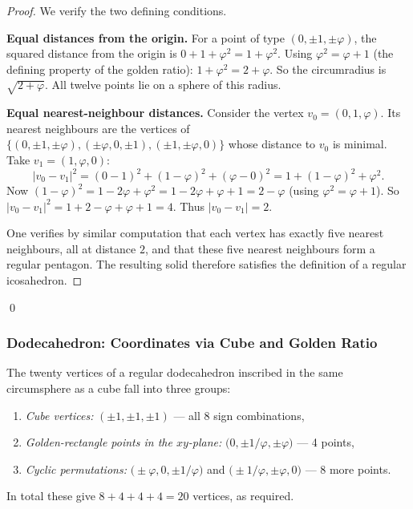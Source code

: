 \begin{proof}
We verify the two defining conditions.

\medskip
\noindent\textbf{Equal distances from the origin.}
For a point of type $(0,\pm 1,\pm\varphi)$, the squared distance from the origin is
$0 + 1 + \varphi^2 = 1 + \varphi^2$.
Using $\varphi^2 = \varphi + 1$ (the defining property of the golden ratio):
$1 + \varphi^2 = 2 + \varphi$.  So the circumradius is $\sqrt{2+\varphi}$.
All twelve points lie on a sphere of this radius.

\medskip
\noindent\textbf{Equal nearest-neighbour distances.}
Consider the vertex $v_0 = (0,1,\varphi)$.  Its nearest neighbours are
the vertices of $\{(0,\pm 1,\pm\varphi),(\pm\varphi,0,\pm 1),(\pm 1,\pm\varphi,0)\}$
whose distance to $v_0$ is minimal.  Take $v_1 = (1,\varphi,0)$:
\[
  |v_0 - v_1|^2 = (0-1)^2 + (1-\varphi)^2 + (\varphi-0)^2
  = 1 + (1-\varphi)^2 + \varphi^2.
\]
Now $(1-\varphi)^2 = 1 - 2\varphi + \varphi^2 = 1 - 2\varphi + \varphi + 1 = 2 - \varphi$
(using $\varphi^2 = \varphi+1$).  So
$|v_0 - v_1|^2 = 1 + 2 - \varphi + \varphi + 1 = 4$.
Thus $|v_0 - v_1| = 2$.

One verifies by similar computation that each vertex has exactly five
nearest neighbours, all at distance $2$, and that these five nearest
neighbours form a regular pentagon.  The resulting solid therefore
satisfies the definition of a regular icosahedron.
\end{proof}
\qed

\subsubsection{Dodecahedron: Coordinates via Cube and Golden Ratio}
\label{subsubsec:dodeca-coords}

The twenty vertices of a regular dodecahedron inscribed in the same
circumsphere as a cube fall into three groups:
\begin{enumerate}
  \item \emph{Cube vertices:}
        $(\pm 1,\pm 1,\pm 1)$ — all 8 sign combinations,
  \item \emph{Golden-rectangle points in the $xy$-plane:}
        $\bigl(0,\pm 1/\varphi,\pm\varphi\bigr)$ — 4 points,
  \item \emph{Cyclic permutations:}
        $\bigl(\pm\varphi,0,\pm 1/\varphi\bigr)$ and
        $\bigl(\pm 1/\varphi,\pm\varphi,0\bigr)$ — 8 more points.
\end{enumerate}
In total these give $8 + 4 + 4 + 4 = 20$ vertices, as required.

